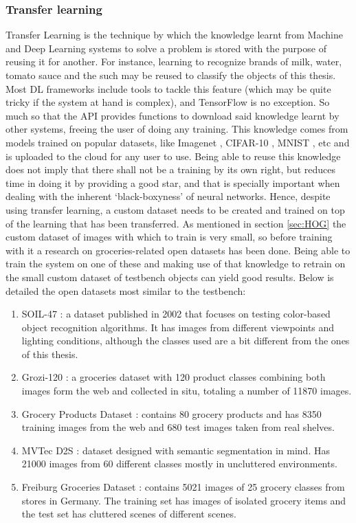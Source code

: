 \documentclass[../main.tex]{subfiles}
\begin{document}
\subsubsection{Transfer learning}
Transfer Learning is the technique by which the knowledge learnt from Machine and Deep Learning systems to solve a problem is stored with the purpose of reusing it for another. For instance, learning to recognize brands of milk, water, tomato sauce and the such may be reused to classify the objects of this thesis. Most DL frameworks include tools to tackle this feature (which may be quite tricky if the system at hand is complex), and TensorFlow is no exception. So much so that the API provides functions to download said knowledge learnt by other systems, freeing the user of doing any training. This knowledge comes from models trained on popular datasets, like Imagenet \cite{imagenet_paper}, CIFAR-10 \cite{Krizhevsky2009LearningML}, MNIST \cite{lecun2010mnist}, etc and is uploaded to the cloud for any user to use. Being able to reuse this knowledge does not imply that there shall not be a training by its own right, but reduces time in doing it by providing a good star, and that is specially important when dealing with the inherent `black-boxyness' of neural networks. Hence, despite using transfer learning, a custom dataset needs to be created and trained on top of the learning that has been transferred. As mentioned in section \ref{sec:HOG} the custom dataset of images with which to train is very small, so before training with it a research on groceries-related open datasets has been done. Being able to train the system on one of these and making use of that knowledge to retrain on the small custom dataset of testbench objects can yield good results. Below is detailed the open datasets most similar to the testbench:

\begin{enumerate}
    \item SOIL-47 \cite{Koubaroulis2002EvaluatingCO}: a dataset published in 2002 that focuses on testing color-based object recognition algorithms. It has images from different viewpoints and lighting conditions, although the classes used are a bit different from the ones of this thesis.
    \item Grozi-120 \cite{grozi120}: a groceries dataset with 120 product classes combining both images form the web and collected in situ, totaling a number of 11870 images.
    \item Grocery Products Dataset \cite{Grocery_Products_ETH}: contains 80 grocery products and has 8350 training images from the web and 680 test images taken from real shelves.
    \item MVTec D2S \cite{follmann2018mvtec}: dataset designed with semantic segmentation in mind. Has 21000 images from 60 different classes mostly in uncluttered environments.
    \item Freiburg Groceries Dataset \cite{freiburg_dataset}: contains 5021 images of 25 grocery classes from stores in Germany. The training set has images of isolated grocery items and the test set has cluttered scenes of different scenes.
\end{enumerate}
\end{document}
